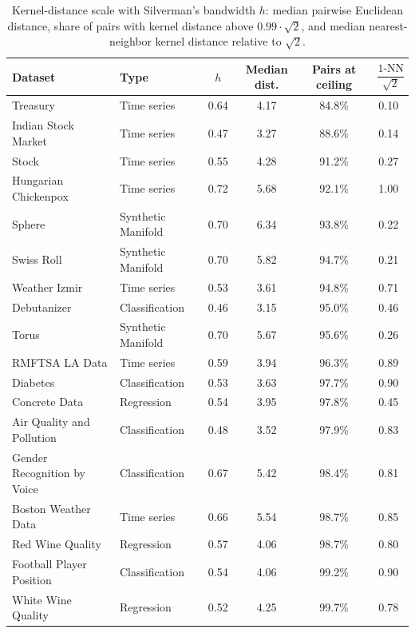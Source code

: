 \begin{table}[h]
    \centering
    \caption{Kernel-distance scale with Silverman's bandwidth $h$: median pairwise Euclidean distance, share of pairs with kernel distance above $0.99 \cdot \sqrt2$, and median nearest-neighbor kernel distance relative to $\sqrt2$.}
    \label{tab:kd}
    \small
    \setlength{\tabcolsep}{10pt}
    \begin{tabular}{l l cccc}
        \toprule
        Dataset & Type & $h$ & Median dist. & Pairs at ceiling & $\dfrac{\operatorname{1-NN}}{\sqrt2}$ \\
        \midrule
        Treasury                    & Time series        & 0.64 & 4.17 & 84.8\% & 0.10 \\
        Indian Stock Market         & Time series        & 0.47 & 3.27 & 88.6\% & 0.14 \\
        Stock                       & Time series        & 0.55 & 4.28 & 91.2\% & 0.27 \\
        Hungarian Chickenpox        & Time series        & 0.72 & 5.68 & 92.1\% & 1.00 \\
        Sphere                      & Synthetic Manifold & 0.70 & 6.34 & 93.8\% & 0.22 \\
        Swiss Roll                  & Synthetic Manifold & 0.70 & 5.82 & 94.7\% & 0.21 \\
        Weather Izmir               & Time series        & 0.53 & 3.61 & 94.8\% & 0.71 \\
        Debutanizer                 & Classification     & 0.46 & 3.15 & 95.0\% & 0.46 \\
        Torus                       & Synthetic Manifold & 0.70 & 5.67 & 95.6\% & 0.26 \\
        RMFTSA LA Data              & Time series        & 0.59 & 3.94 & 96.3\% & 0.89 \\
        Diabetes                    & Classification     & 0.53 & 3.63 & 97.7\% & 0.90 \\
        Concrete Data               & Regression         & 0.54 & 3.95 & 97.8\% & 0.45 \\
        Air Quality and Pollution   & Classification     & 0.48 & 3.52 & 97.9\% & 0.83 \\
        Gender Recognition by Voice & Classification     & 0.67 & 5.42 & 98.4\% & 0.81 \\
        Boston Weather Data         & Time series        & 0.66 & 5.54 & 98.7\% & 0.85 \\
        Red Wine Quality            & Regression         & 0.57 & 4.06 & 98.7\% & 0.80 \\
        Football Player Position    & Classification     & 0.54 & 4.06 & 99.2\% & 0.90 \\
        White Wine Quality          & Regression         & 0.52 & 4.25 & 99.7\% & 0.78 \\
        \bottomrule
    \end{tabular}
\end{table}